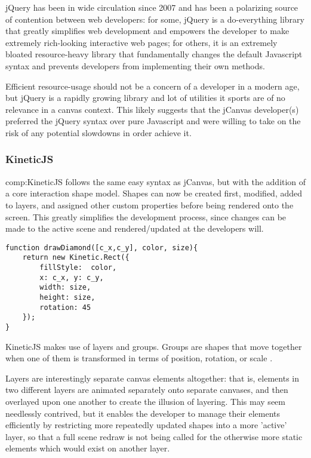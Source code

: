 jQuery has been in wide circulation since 2007 and has been a polarizing source of contention between web developers: for some, jQuery is a do-everything library that greatly simplifies web development and empowers the developer to make extremely rich-looking interactive web pages; for others, it is an extremely bloated resource-heavy library that fundamentally changes the default Javascript syntax and prevents developers from implementing their own methods.

Efficient resource-usage should not be a concern of a developer in a modern age, but jQuery is a rapidly growing library  and lot of utilities it sports are of no relevance in a canvas context. This likely suggests that the jCanvas developer(s) preferred the jQuery syntax over pure Javascript and were willing to take on the risk of any potential slowdowns in order achieve it.


\subsubsection{KineticJS}

\gls{comp:KineticJS} follows the same easy syntax as jCanvas, but with the addition of a core interaction shape model. Shapes can now be created first, modified, added to layers, and assigned other custom properties before being rendered onto the screen. This greatly simplifies the development process, since changes can be made to the active scene and rendered/updated at the developers will.

\begingroup
\begin{spacing}{1}
\begin{lstlisting}[label=code:kineticjs]
function drawDiamond([c_x,c_y], color, size){
	return new Kinetic.Rect({
		fillStyle:  color,
		x: c_x,	y: c_y,
		width: size,
		height: size,
		rotation: 45
	});
}
\end{lstlisting}
\vspace{-10pt}
\end{spacing}
\endgroup

KineticJS makes use of layers and groups. Groups are shapes that move together when one of them is transformed in terms of position, rotation, or scale \cite{kineticjs}. 

Layers are interestingly separate canvas elements altogether: that is, elements in two different layers are animated separately onto separate canvases, and then overlayed upon one another to create the illusion of layering.
This may seem needlessly contrived, but it enables the developer to manage their elements efficiently by restricting more repeatedly updated shapes into a more 'active' layer, so that a full scene redraw is not being called for the otherwise more static elements which would exist on another layer.

